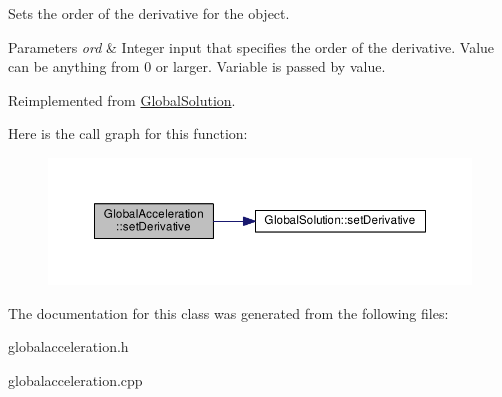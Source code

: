 Sets the order of the derivative for the object. 


\begin{DoxyParams}{Parameters}
{\em ord} & Integer input that specifies the order of the derivative. Value can be anything from 0 or larger. Variable is passed by value. \\
\hline
\end{DoxyParams}


Reimplemented from \hyperlink{class_global_solution_a537163391f1f55d073720b20f69acfa5}{Global\-Solution}.



Here is the call graph for this function\-:\nopagebreak
\begin{figure}[H]
\begin{center}
\leavevmode
\includegraphics[width=350pt]{class_global_acceleration_a14a041ea42d4c1bc10211c9a44aa3431_cgraph}
\end{center}
\end{figure}




The documentation for this class was generated from the following files\-:\begin{DoxyCompactItemize}
\item 
globalacceleration.\-h\item 
globalacceleration.\-cpp\end{DoxyCompactItemize}
